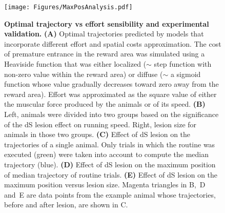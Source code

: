 \begin{figure}[h!]
 \begin{center}
	\texttt{[image: Figures/MaxPosAnalysis.pdf]}
	\caption
	{\textbf{Optimal trajectory vs effort sensibility and experimental validation.}
	\textbf{(A)} Optimal trajectories predicted by models that incorporate different effort and spatial costs approximation.
	The cost of premature entrance in the reward area was simulated using a Heaviside function that was either localized ($\sim$ step function with non-zero value within the reward area) or diffuse ($\sim$ a sigmoid function whose value gradually decreases toward zero away from the reward area).
	Effort was approximated as the square value of either the muscular force produced by the animals or of its speed.
	\textbf{(B)} Left, animals were divided into two groups based on the significance of the dS lesion effect on running speed. Right, lesion size for animals in those two groups.
	\textbf{(C)} Effect of dS lesion on the trajectories of a single animal. Only trials in which the routine was executed (green) were taken into account to compute the median trajectory (blue).
	\textbf{(D)} Effect of dS lesion on the maximum position of median trajectory of routine trials.
	\textbf{(E)} Effect of dS lesion on the maximum position versus lesion size.
	Magenta triangles in B,~D and~E are data points from the example animal whose trajectories, before and after lesion, are shown in C.
	}
	\label{fig4}
 \end{center}
\end{figure}
